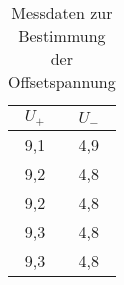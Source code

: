 \begin{table}[h]
    \centering
    \caption{Messdaten zur Bestimmung der Offsetspannung}
    \label{tab:offsetspannung}
    \begin{tabular}{c c}
      \toprule
      $U_+$ & $U_-$ \\
      \midrule
      9,1&4,9\\
      9,2&4,8\\
      9,2&4,8\\
      9,3&4,8\\
      9,3&4,8\\
      \bottomrule
    \end{tabular}
  \end{table}
